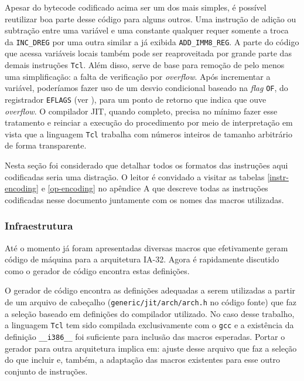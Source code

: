 Apesar do bytecode codificado acima ser um dos mais simples, é
possível reutilizar boa parte desse código para alguns outros. Uma
instrução de adição ou subtração entre uma variável e uma constante
qualquer requer somente a troca da \verb!INC_DREG! por uma outra
similar a já exibida \verb!ADD_IMM8_REG!. A parte do código que acessa
variáveis locais também pode ser reaproveitada por grande parte das
demais instruções \texttt{Tcl}. Além disso, serve de base para remoção
de pelo menos uma simplificação: a falta de verificação por
\textit{overflow}. Após incrementar a variável, poderíamos fazer uso
de um desvio condicional baseado na \textit{flag} \verb!OF!, do
registrador \verb!EFLAGS! (ver ),
para um ponto de retorno que indica que
ouve \textit{overflow}. O compilador JIT, quando completo, precisa no
mínimo fazer esse tratamento e reinciar a execução do procedimento por meio
de interpretação em vista que a linguagem \texttt{Tcl}
trabalha com números inteiros de tamanho arbitrário de forma
transparente.

Nesta seção foi considerado que detalhar todos os formatos das instruções aqui
codificadas seria uma distração. O leitor é convidado a visitar as
tabelas \ref{instr-encoding} e \ref{op-encoding} no apêndice A que
descreve todas as instruções codificadas nesse documento juntamente
com os nomes das macros utilizadas.


\subsubsection{Infraestrutura}

Até o momento já foram apresentadas diversas macros que efetivamente
geram código de máquina para a arquitetura IA-32. Agora é rapidamente
discutido como o gerador de código encontra estas definições.

O gerador de código encontra as definições adequadas a serem
utilizadas a partir de um arquivo de cabeçalho
(\verb!generic/jit/arch/arch.h! no código fonte) que faz a seleção
baseado em definições do compilador utilizado. No caso desse trabalho,
a linguagem \texttt{Tcl} tem sido compilada exclusivamente com o
\texttt{gcc} e a existência da definição \verb!__i386__! foi
suficiente para inclusão das macros esperadas. Portar o gerador para
outra arquitetura implica em: ajuste desse arquivo que faz a seleção do
que incluir e, também, a adaptação das macros existentes para esse outro
conjunto de instruções.

%



